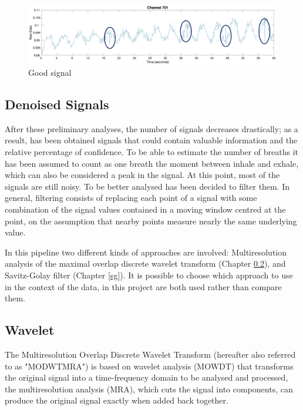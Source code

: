 \begin{figure}[H]
    \centering
    \includegraphics[width=\textwidth]{img/goodSpikes.png}
    \caption{Good signal}
    \label{fig:goodSignal}
\end{figure}

\subsection{Denoised Signals}
After these preliminary analyses, the number of signals decreases drastically; as a result, has been obtained signals that could contain valuable information and the relative percentage of confidence.
To be able to estimate the number of breaths it has been assumed to count as one breath the moment between inhale and exhale, which can also be considered a peak in the signal.
At this point, most of the signals are still noisy. To be better analysed has been decided to filter them. In general, filtering consists of replacing each point of a signal with some combination of the signal values contained in a moving window centred at the point, on the assumption that nearby points measure nearly the same underlying value.

In this pipeline two different kinds of approaches are involved: Multiresolution analysis of the maximal overlap discrete wavelet transform (Chapter \ref{Wavelet}), and Savitz-Golay filter (Chapter \ref{sg}).
It is possible to choose which approach to use in the context of the data, in this project are both used rather than compare them.


\subsection{Wavelet} \label{Wavelet}

The Multiresolution Overlap Discrete Wavelet Transform (hereafter also referred to as "MODWTMRA") is based on wavelet analysis (MOWDT) that transforms the original signal into a time-frequency domain to be analysed and processed, the multiresolution analysis (MRA), which cuts the signal into components, can produce the original signal exactly when added back together.

